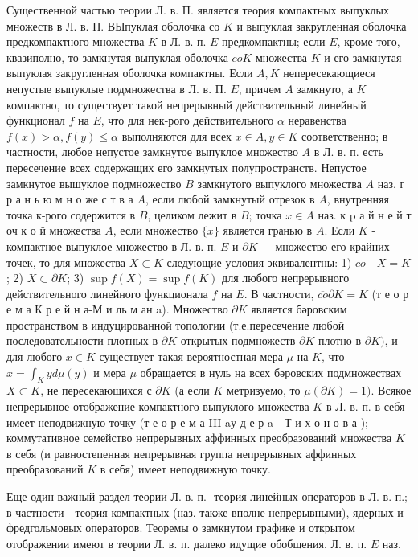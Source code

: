 \documentclass[10pt]{article}
\begin{document}
Существенной частью теории Л. в. П. является теория компактных выпуклых множеств в Л. в. П. ВЫпуклая оболочка со $K$ и выпуклая закругленная оболочка предкомпактного множества $K$ в Л. в. п. $E$ предкомпактны; если $E$, кроме того, квазиполно, то замкнутая выпуклая оболочка $\overline{c o} K$ множества $K$ и его замкнутая выпуклая закругленная оболочка компактны. Если $A, K$ непересекающиеся непустые выпуклые подмножества в Л. в. П. $E$, причем $A$ замкнуто, а $K$ компактно, то существует такой непрерывный действительный линейный функционал $f$ на $E$, что для нек-рого действительного $\alpha$ неравенства $f(x)>\alpha, f(y) \leqslant \alpha$ выполняются для всех $x \in A, y \in K$ соответственно; в частности, любое непустое замкнутое выпуклое множество $A$ в Л. в. п. есть пересечение всех содержащих его замкнутых полупространств. Непустое замкнутое вышуклое подмножество $B$ замкнутого выпуклого множества $A$ наз. г р а н ь ю м н о же с т в а $A$, если любой замкнутый отрезок в $A$, внутренняя точка к-рого содержится в $B$, целиком лежит в $B$; точка $x \in A$ наз. к $\mathrm{p}$ а й н е й т оч к о й множества $A$, если множество $\{x\}$ является гранью в $A$. Если $K$ - компактное выпуклое множество в Л. в. п. $E$ и $\partial K-$ множество его крайних точек, то для множества $X \subset K$ следующие условия эквивалентны: 1) $\overline{c o} \quad X=K$; 2) $\bar{X} \subset \partial K$; 3) $\sup f(X)=\sup f(K)$ для любого непрерывного действительного линейного функционала $f$ на $E$. В частности, $\overline{c o} \partial K=K$ (т е о р е м а $К$ р е й н а-М и ль м ан a). Множество $\partial K$ является бәровским пространством в индуцированной топологии (т.е.пересечение любой последовательности плотных в $\partial K$ открытых подмножеств $\partial K$ плотно в $\partial K)$, и для любого $x \in K$ существует такая вероятностная мера $\mu$ на $K$, что $x=\int_{K} y d \mu(y)$ и мера $\mu$ обращается в нуль на всех бәровских подмножествах $X \subset K$, не пересекающихся с $\partial K$ (а если $K$ метризуемо, то $\mu(\partial K)=1)$. Всякое непрерывное отображение компактного выпуклого множества $K$ в Л. в. п. в себя имеет неподвижную точку (т е о р е м а III aу д е р a - Т и х о н о в а ); коммутативное семейство непрерывных аффинных преобразований множества $K$ в себя (и равностепенная непрерывная группа непрерывных аффинных преобразований $K$ в себя) имеет неподвижную точку.



Еще один важный раздел теории Л. в. п.- теория линейных операторов в Л. в. п.; в частности - теория компактных (наз. также вполне непрерывными), ядерных и фредгольмовых операторов. Теоремы о замкнутом графике и открытом отображении имеют в теории Л. в. п. далеко идущие обобщения. Л. в. п. $E$ наз.
\end{document}
